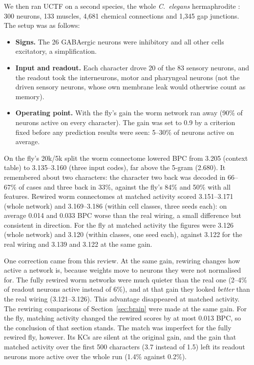 \documentclass[conference]{IEEEtran}
\begin{document}
We then ran UCTF on a second species, the whole \textit{C.~elegans}
hermaphrodite \cite{cook2019}: 300 neurons, 133 muscles, 4{,}681 chemical
connections and 1{,}345 gap junctions. The setup was as follows:
\begin{itemize}
\item \textbf{Signs.} The 26 GABAergic neurons \cite{mcintire1993} were
inhibitory and all other cells excitatory, a simplification.
\item \textbf{Input and readout.} Each character drove 20 of the 83 sensory
neurons, and the readout took the interneurons, motor and pharyngeal neurons
(not the driven sensory neurons, whose own membrane leak would otherwise count
as memory).
\item \textbf{Operating point.} With the fly's gain the worm network ran away
(90\% of neurons active on every character). The gain was set to 0.9 by a
criterion fixed before any prediction results were seen: 5--30\% of neurons
active on average.
\end{itemize}

On the fly's 20k/5k split the worm connectome lowered BPC from 3.205 (context
table) to 3.135--3.160 (three input codes), far above the 5-gram (2.680). It
remembered about two characters: the character two back was decoded in
66--67\% of cases and three back in 33\%, against the fly's 84\% and 50\% with
all features. Rewired worm connectomes at matched activity scored 3.151--3.171
(whole network) and 3.169--3.186 (within cell classes, three seeds each): on
average 0.014 and 0.033 BPC worse than the real wiring, a small difference but
consistent in direction. For the fly at matched activity the
figures were 3.126 (whole network) and 3.120 (within classes, one seed each),
against 3.122 for the real wiring and 3.139 and 3.122 at the same gain.

One correction came from this review. At the same gain, rewiring changes how
active a network is, because weights move to neurons they were not normalised
for. The fully rewired worm networks were much quieter than the real one (2--4\%
of readout neurons active instead of 6\%), and at that gain they looked
\emph{better} than the real wiring (3.121--3.126). This advantage disappeared
at matched activity. The rewiring comparisons of Section~\ref{sec:brain} were
made at the same gain. For the fly, matching activity changed the rewired scores
by at most 0.013 BPC, so the conclusion of that section stands. The match was
imperfect for the fully rewired fly, however. Its KCs are silent at the
original gain, and the gain that matched activity over the first 500
characters (3.7 instead of 1.5) left its readout neurons more active over the
whole run (1.4\% against 0.2\%).
\end{document}
